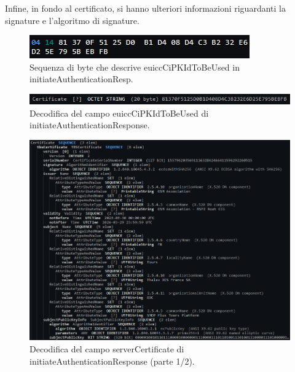 \documentclass[10pt, oneside]{book}
\begin{document}
Infine, in fondo al certificato, si hanno ulteriori informazioni riguardanti la signature e l'algoritmo di signature.
\begin{figure}
\includegraphics[width=\linewidth]{asn1-euiccCiPKIdToBeUsed.png}
\caption{Sequenza di byte che descrive euiccCiPKIdToBeUsed in initiateAuthenticationResp.}
\label{fig:asn1-euiccCiPKIdToBeUsed}
\end{figure}
\begin{figure}
\includegraphics[width=\linewidth]{decode-euiccCiPKIdToBeUsed.png}
\caption{Decodifica del campo euiccCiPKIdToBeUsed di initiateAuthenticationResponse.}
\label{fig:decode-euiccCiPKIdToBeUsed}
\end{figure}
\begin{figure}
\includegraphics[width=\linewidth]{decode-serverCertificate1.png}
\caption{Decodifica del campo serverCertificate di initiateAuthenticationResponse (parte 1/2).}
\label{fig:decode-serverCertificate1}
\end{figure}
\end{document}
